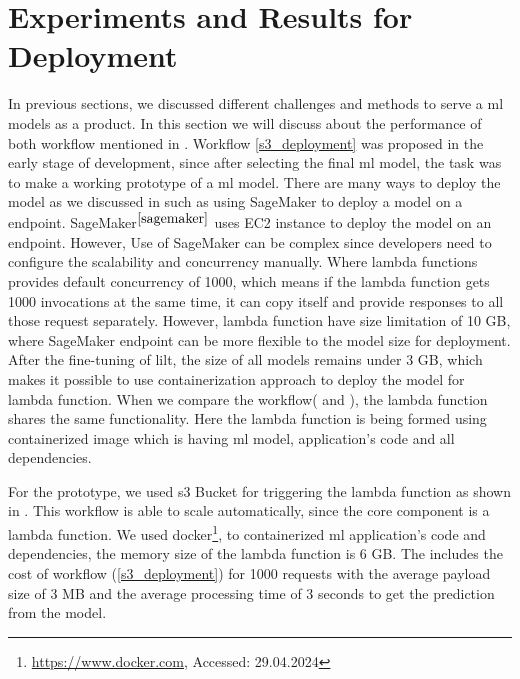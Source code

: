 \section{Experiments and Results for Deployment}
In previous sections, we discussed different challenges and methods to serve a \acrshort{ml} models as a product. In this section we will discuss about the performance of both workflow mentioned in . Workflow \ref{s3_deployment} was proposed in the early stage of development, since after selecting the final \acrshort{ml} model, the task was to make a working prototype of a \acrshort{ml} model. There are many ways to deploy the model as we discussed in  such as using SageMaker to deploy a model on a endpoint. SageMaker\(^{\ref{sagemaker}}\) uses EC2 instance to deploy the model on an endpoint. However, Use of SageMaker can be complex since developers need to configure the scalability and concurrency manually. Where lambda functions provides default concurrency of 1000, which means if the lambda function gets 1000 invocations at the same time, it can copy itself and provide responses to all those request separately. However, lambda function have size limitation of 10 GB, where SageMaker endpoint can be more flexible to the model size for deployment. After the fine-tuning of \acrshort{lilt}, the size of all models remains under 3 GB, which makes it possible to use containerization approach to deploy the model for lambda function. When we compare the workflow( and ), the lambda function shares the same functionality. Here the lambda function is being formed using containerized image which is having \acrshort{ml} model, application's code and all dependencies.  

For the prototype, we used s3 Bucket for triggering the lambda function as shown in . This workflow is able to scale automatically, since the core component is a lambda function. We used docker\footnote{\url{https://www.docker.com}, Accessed: 29.04.2024}, to containerized \acrshort{ml} application's code and dependencies, the memory size of the lambda function is 6 GB. The  includes the cost of  workflow (\ref{s3_deployment}) for 1000 requests with the average payload size of 3 MB and the average processing time of 3 seconds to get the prediction from the model.

